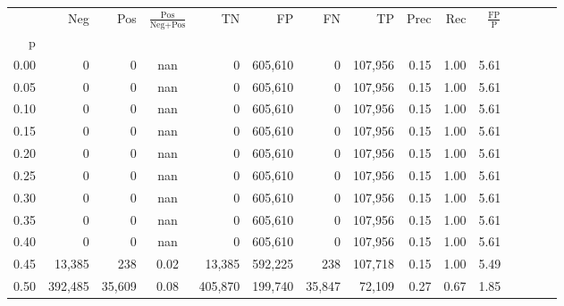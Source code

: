 \begin{tabular}{rrrcrrrrrrrrrrr}
\toprule
{} &      Neg &     Pos & $\frac{\text{Pos}}{\text{Neg}+\text{Pos}}$ &       TN &       FP &       FN &       TP &  Prec &   Rec & $\frac{\text{FP}}{\text{P}}$ \\
p    &          &         &                                            &          &          &          &          &       &       &                              \\
\midrule
0.00 &        0 &       0 &                                        nan &        0 &  605,610 &        0 &  107,956 &  0.15 &  1.00 &                         5.61 \\
0.05 &        0 &       0 &                                        nan &        0 &  605,610 &        0 &  107,956 &  0.15 &  1.00 &                         5.61 \\
0.10 &        0 &       0 &                                        nan &        0 &  605,610 &        0 &  107,956 &  0.15 &  1.00 &                         5.61 \\
0.15 &        0 &       0 &                                        nan &        0 &  605,610 &        0 &  107,956 &  0.15 &  1.00 &                         5.61 \\
0.20 &        0 &       0 &                                        nan &        0 &  605,610 &        0 &  107,956 &  0.15 &  1.00 &                         5.61 \\
0.25 &        0 &       0 &                                        nan &        0 &  605,610 &        0 &  107,956 &  0.15 &  1.00 &                         5.61 \\
0.30 &        0 &       0 &                                        nan &        0 &  605,610 &        0 &  107,956 &  0.15 &  1.00 &                         5.61 \\
0.35 &        0 &       0 &                                        nan &        0 &  605,610 &        0 &  107,956 &  0.15 &  1.00 &                         5.61 \\
0.40 &        0 &       0 &                                        nan &        0 &  605,610 &        0 &  107,956 &  0.15 &  1.00 &                         5.61 \\
0.45 &   13,385 &     238 &                                       0.02 &   13,385 &  592,225 &      238 &  107,718 &  0.15 &  1.00 &                         5.49 \\
0.50 &  392,485 &  35,609 &                                       0.08 &  405,870 &  199,740 &   35,847 &   72,109 &  0.27 &  0.67 &                         1.85 \\

\end{tabular}

